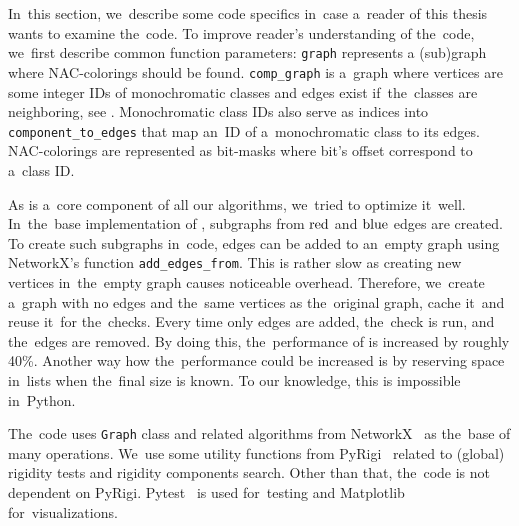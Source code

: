 In~this section, we~describe some code specifics
in~case a~reader of this thesis wants to examine the~code.
%
To improve reader's understanding of the~code,
we~first describe common function parameters:
\texttt{graph} represents a (sub)graph where NAC-colorings should be found.
%
\texttt{comp\_graph} is a~graph where vertices are some integer IDs of monochromatic classes
and edges exist if~the~classes are neighboring,
see .
%
Monochromatic class IDs also serve as indices into \texttt{component\_to\_edges}
that map an~ID of a~monochromatic class to its edges.
%
NAC-colorings are represented as bit-masks where bit's offset correspond to a~class ID\@.

As \IsNACColoring{} is a~core component of all our algorithms,
we~tried to optimize it~well.
%
In~the~base implementation of \IsNACColoring{},
subgraphs from \( \text{red} \) and \( \text{blue} \) edges are created.
To create such subgraphs in~code, edges can be added to an~empty graph
using NetworkX's function \texttt{add\_edges\_from}.
%
This is rather slow as creating new vertices in~the~empty graph causes noticeable overhead.
Therefore, we~create a~graph with no edges and the~same vertices as the~original graph,
cache it~and reuse it~for the~checks.
Every time only edges are added, the~check is run, and the~edges are removed.
By doing this, the~performance of \IsNACColoring{} is increased by roughly 40\%.
%
Another way how the~performance could be increased is by reserving space in~lists
when the~final size is known.
To our knowledge, this is impossible in~Python.

The~code uses \texttt{Graph} class and related algorithms from NetworkX~\cite{networkx}
as the~base of many operations. We~use some utility functions from PyRigi~\cite{pyrigi}
related to (global) rigidity tests and rigidity components search.
Other than that, the~code is not dependent on PyRigi.
%
Pytest~\cite{pytest} is used for~testing and
Matplotlib~\cite{matplotlib} for~visualizations.

